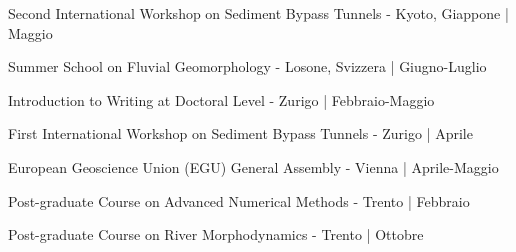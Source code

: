  Second International Workshop on Sediment Bypass Tunnels - Kyoto, Giappone | Maggio
\sectionsep

 Summer School on Fluvial Geomorphology - Losone, Svizzera | Giugno-Luglio
\sectionsep

 Introduction to Writing at Doctoral Level - Zurigo | Febbraio-Maggio
\sectionsep

 First International Workshop on Sediment Bypass Tunnels - Zurigo | Aprile
\sectionsep

 European Geoscience Union (EGU) General Assembly - Vienna | Aprile-Maggio
\sectionsep

 Post-graduate Course on Advanced Numerical Methods - Trento | Febbraio
\sectionsep

 Post-graduate Course on River Morphodynamics - Trento | Ottobre
\sectionsep
